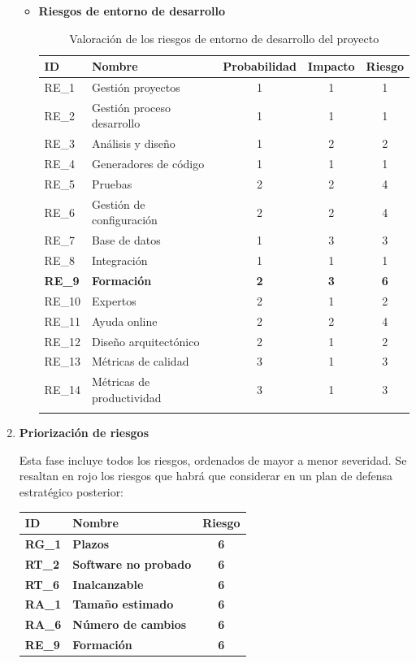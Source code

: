 \begin{enumerate}
\begin{itemize}
\item \textbf{Riesgos de entorno de desarrollo}
\begin{longtable}{l p{5cm} ccc}
\hline
\textbf{ID} & \textbf{Nombre} & \textbf{Probabilidad} & \textbf{Impacto} & \textbf{Riesgo} \\
\hline
\endhead
\endfoot
RE\_1 & 
Gestión proyectos &
1 &
1 &
1 
 \\
RE\_2 & 
Gestión proceso desarrollo &
1 &
1 &
1 
 \\
RE\_3 & 
Análisis y diseño &
1 &
2 &
2 
 \\
RE\_4 & 
Generadores de código &
1 &
1 &
1 
 \\
RE\_5 & 
Pruebas &
2 &
2 &
4 
 \\
RE\_6 & 
Gestión de configuración &
2 &
2 &
4 
 \\
RE\_7 & 
Base de datos  &
1 &
3 &
3 
 \\
RE\_8 & 
Integración &
1 &
1 &
1 
 \\
\textbf{RE\_9} & 
\textbf{Formación} &
\textbf{2} &
\textbf{3} &
\textbf{6} 
 \\
RE\_10 & 
Expertos &
2 &
1 &
2 
 \\
RE\_11 & 
Ayuda online &
2 &
2 &
4 
 \\
RE\_12 & 
Diseño arquitectónico &
2 &
1 &
2 
 \\
RE\_13 & 
Métricas de calidad &
3 &
1 &
3 
 \\
RE\_14 & 
Métricas de productividad &
3 &
1 &
3 
\\
\hline
\caption{Valoración de los riesgos de entorno de desarrollo del proyecto}\label{ries_entorno_valoracion}\\
\end{longtable}

\endgroup

\end{itemize}

\item \textbf{Priorización de riesgos} \par
Esta fase incluye todos los riesgos, ordenados de mayor a menor severidad. Se resaltan en rojo los riesgos que habrá que considerar en un plan de defensa estratégico posterior:


\begingroup
\renewcommand\arraystretch{1.3}

\begin{longtable}{l p{5cm} c}
\hline
\textbf{ID} & \textbf{Nombre} & \textbf{Riesgo} \\
\hline
\endhead
\endfoot
\textbf{RG\_1} & 
\textbf{Plazos} &
\textbf{6} 
 \\
\textbf{RT\_2} & 
\textbf{Software no probado} &
\textbf{6} 
 \\
\textbf{RT\_6} & 
\textbf{Inalcanzable} &
\textbf{6} 
 \\
\textbf{RA\_1} & 
\textbf{Tamaño estimado} &
\textbf{6} 
 \\
\textbf{RA\_6} & 
\textbf{Número de cambios} &
\textbf{6} 
 \\
\textbf{RE\_9} & 
\textbf{Formación} &
\textbf{6} 
 \\
 

\end{longtable}
\end{enumerate}
